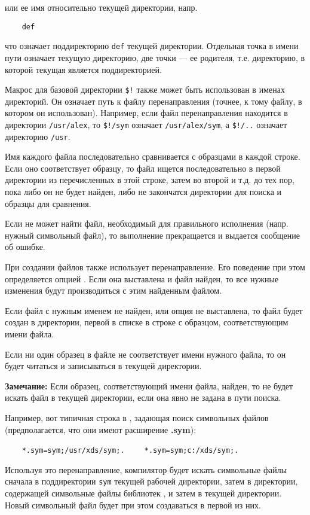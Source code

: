 или ее имя относительно текущей директории, напр.

\verb'    def'

что означает поддиректорию \verb'def' текущей директории.
Отдельная точка в имени пути означает текущую директорию,
две точки --- ее родителя, т.е. директорию, в которой текущая
является поддиректорией.

Макрос для базовой директории \verb|$!|  %
также может быть использован в именах директорий.
Он  означает путь к файлу перенаправления (точнее, к тому файлу, 
в котором он использован). %
Например, если файл
перенаправления находится в директории \verb|/usr/alex|, то
\verb|$!/sym| означает \verb|/usr/alex/sym|, а \verb|$!/..|
означает директорию \verb|/usr|.

Имя каждого файла последовательно сравнивается с образцами в каждой строке.
Если оно соответствует образцу, то файл ищется последовательно в первой
директории из перечисленных в этой строке, затем во второй и т.д. до
тех пор, пока либо он не будет найден, либо не закончатся директории
для поиска и образцы для сравнения.

Если \xds{} не может найти файл, необходимый для правильного исполнения
(напр. нужный символьный файл), то выполнение прекращается и выдается 
сообщение об ошибке.

При создании файлов \xds{} также использует перенаправление. Его поведение
при этом определяется опцией .
Если она выставлена и файл найден, то все нужные изменения будут 
производиться с этим найденным файлом.

Если файл с нужным именем не найден, или опция
 не выставлена, то файл будет создан в директории,
первой в списке в строке с образцом, соответствующим имени файла.

Если ни один образец в файле {\tt \red} не соответствует имени нужного
файла, то он будет читаться и записываться в текущей директории.

{\bf Замечание:}
Если образец, соответствующий имени файла, найден, то
\xds{} не будет искать файл в текущей директории, если она явно не
задана в пути поиска.

Например, вот типичная строка в {\tt \red}, задающая поиск
символьных файлов (предполагается, что они имеют расширение
{\bf.sym}):

\ifunix
\verb'    *.sym=sym;/usr/xds/sym;.'
\else
\verb'    *.sym=sym;c:/xds/sym;.'
\fi

Используя это перенаправление, компилятор будет искать символьные файлы
сначала в поддиректории \verb|sym| текущей рабочей директории,
затем в директории, содержащей символьные файлы библиотек \xds{}, 
и затем в текущей директории. Новый символьный файл будет при этом
создаваться в первой из них.

